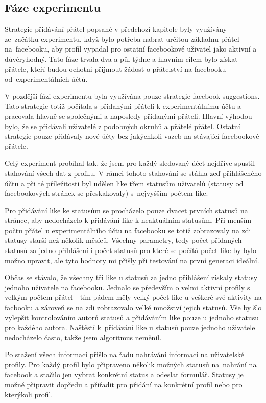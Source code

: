 \documentclass[thesis=M,czech]{FITthesis}[2013/05/10]
\begin{document}
\subsection{Fáze experimentu}

Strategie přidávání přátel popsané v předchozí kapitole byly využívány ze~začátku experimentu, když bylo potřeba nabrat určitou základnu přátel na~facebooku, aby profil vypadal pro ostatní facebookové uživatel jako aktivní a důvěryhodný. Tato fáze trvala dva a půl týdne a hlavním cílem bylo získat přátele, kteří budou ochotni přijmout žádost o přátelství na facebooku od~experimentálních účtů. 

V pozdější fázi experimentu byla využívána pouze strategie facebook suggestions. Tato strategie totiž počítala s přidanými přáteli k experimentálnímu účtu a pracovala hlavně se společnými a naposledy přidanými přáteli. Hlavní výhodou bylo, že se přidávali uživatelé z podobných okruhů a přátelé přátel. Ostatní strategie pouze přidávaly nové účty bez jakýchkoli vazeb na stávající facebookové přátele. 

Celý experiment probíhal tak, že jsem pro každý sledovaný účet nejdříve spustil stahování všech dat z profilu. V rámci tohoto stahování se stáhla zeď přihlášeného účtu a při té příležitosti byl udělen like třem statusům uživatelů (statusy od facebookových stránek se přeskakovaly) s~nejvyšším počtem like.

Pro přidávání like ke statusům se procházelo pouze dvacet prvních statusů na stránce, aby nedocházelo k přidávání like k neaktuálním statusům. Při menším počtu přátel u experimentálního účtu na facebooku se totiž zobrazovaly na zdi statusy starší než několik měsíců. Všechny parametry, tedy počet přidaných statusů za jedno příhlášení i počet statusů pro které se počítá počet like by bylo možno upravit, ale tyto hodnoty mi přišly při testování na první generaci ideální.

Občas se stávalo, že všechny tři like u statusů za jedno přihlášení získaly statusy jednoho uživatele na facebooku. Jednalo se především o velmi aktivní profily s velkým počtem přátel - tím pádem měly velký počet like u veškeré své aktivity na facbooku a zároveň se na zdi zobrazovalo velké množství jejich statusů. Vše by šlo vylepšit kontrolováním autorů statusů a přidáváním like pouze u jednoho statusu pro každého autora. Naštěstí k~přidávání like u statusů pouze jednoho uživatele nedocházelo často, takže jsem algoritmus neměnil.

Po stažení všech informací přišlo na řadu nahrávání informací na uživatelské profily. Pro každý profil bylo připraveno několik možných statusů na~nahrání na facebook a stačilo jen vybrat konkrétní status a odeslat formulář. Statusy je možné připravit dopředu a přiřadit pro přidání na konkrétní profil nebo pro kterýkoli profil.
\end{document}
